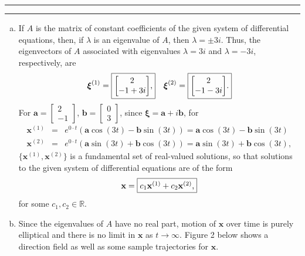 \documentclass[11pt]{article}
\newcounter{questionCounter}
\newcounter{partCounter}[questionCounter]
\newenvironment{question}[2][\arabic{questionCounter}]{%
    \setcounter{partCounter}{0}%
    \vspace{.25in} \hrule \vspace{0.5em}%
        \noindent{\bf #2}%
    \vspace{0.8em} \hrule \vspace{.10in}%
    \addtocounter{questionCounter}{1}%
}{}
\newcommand{\ba}{\mathbf{a}}
\newcommand{\bb}{\mathbf{b}}
\newcommand{\bx}{\mathbf{x}}
\newcommand{\bxi}{\boldsymbol{\xi}}
\begin{document}
\begin{question}{Section 7.6, Problem 6}
\begin{enumerate}[(a)]
\item
If $A$ is the matrix of constant coefficients of the given system of
differential equations, then, if $\lambda$ is an eigenvalue of $A$, then
$\lambda = \pm 3i$. Thus, the eigenvectors of $A$ associated with eigenvalues
$\lambda = 3i$ and $\lambda = -3i$, respectively, are
\[\bxi^{(1)}
 = \mbox{\fbox{$\begin{bmatrix}
        2     \\
        -1 + 3i
   \end{bmatrix}$,}} \quad
 \bxi^{(2)}
 = \mbox{\fbox{$\begin{bmatrix}
        2     \\
        -1 - 3i
   \end{bmatrix}$.}}
\]
For
$\ba = \begin{bmatrix} 2 \\ -1 \end{bmatrix}$,
$\bb = \begin{bmatrix} 0 \\ 3  \end{bmatrix}$, since $\bxi = \ba + i\bb$, for
\begin{eqnarray*}
\bx^{(1)}& = & e^{0\cdot t}(\ba\cos(3 t) - \bb\sin(3 t))
            = \ba\cos(3 t) - \bb\sin(3 t) \\
\bx^{(2)} & = & e^{0\cdot t}(\ba\sin(3 t)+ \bb\cos(3 t))
 = \ba\sin(3 t)+ \bb\cos(3 t),
\end{eqnarray*}
$\{\bx^{(1)},\bx^{(2)}\}$ is a fundamental set of real-valued solutions, so
that solutions to the given system of differential equations are of the form
\[\bx = \mbox{\fbox{$c_1\bx^{(1)} + c_2\bx^{(2)}$,}}\]
for some $c_1,c_2 \in \mathbb{R}$.

\item Since the eigenvalues of $A$ have no real part, motion of $\bx$ over
time is purely elliptical and there is no limit in $\bx$ as
$t \rightarrow \infty$. Figure 2 below shows a direction field as well as
some sample trajectories for $\bx$.
\vspace{2in}
\end{enumerate}
\end{question}
\end{document}
